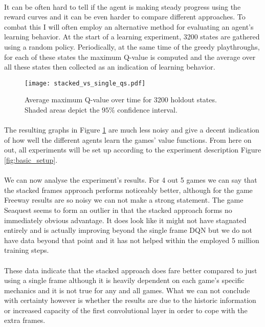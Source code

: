 \paragraph{}
It can be often hard to tell if the agent is making steady progress
using the reward curves
and it can be even harder to compare different approaches.
To combat this I will often employ an alternative method
for evaluating an agent's learning behavior.
At the start of a learning experiment, 3200 states are gathered
using a random policy.
Periodically,
at the same time of the greedy playthroughs,
for each of these states the maximum Q-value is computed
and the average over all these states then collected
as an indication of learning behavior.

\begin{figure}[htpb]
  \centering
  \texttt{[image: stacked\_vs\_single\_qs.pdf]}
  \caption[DQN Q-values over time]{
    Average maximum Q-value over time for 3200 holdout states.
    Shaded areas depict the $95\%$ confidence interval.
  }
  \label{fig:stacked_vs_single_qs}
\end{figure}

\paragraph{}
The resulting graphs in Figure \ref{fig:stacked_vs_single_qs}
are much less noisy
and give a decent indication of how well the
different agents learn the games' value functions.
From here on out,
all experiments will be set up according to
the experiment description
Figure \ref{fig:basic_setup}.

\paragraph{}
We can now analyse the experiment's results.
For 4 out 5 games we can say that the stacked frames approach
performs noticeably better,
although for the game Freeway results are so noisy
we can not make a strong statement.
The game Seaquest seems to form an outlier
in that the stacked approach forms no immediately obvious advantage.
It does look like it might not have stagnated entirely
and is actually improving beyond the single frame DQN
but we do not have data beyond that point
and it has not helped within the employed 5 million training steps.

\paragraph{}
These data indicate that the stacked approach does
fare better compared to just using a single frame
although it is heavily dependent on each game's specific mechanics
and it is not true for any and all games.
What we can not conclude with certainty however
is whether the results are due to the historic information
or increased capacity of the first convolutional layer
in order to cope with the extra frames.


